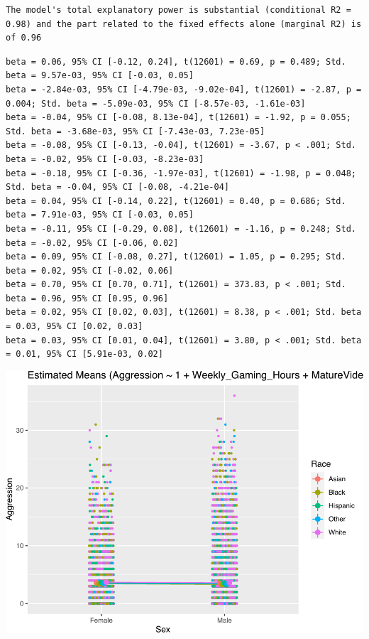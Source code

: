 \documentclass{article}
\begin{document}
\begin{verbatim}
The model's total explanatory power is substantial (conditional R2 = 0.98) and the part related to the fixed effects alone (marginal R2) is of 0.96
\end{verbatim}

\begin{verbatim}
beta = 0.06, 95% CI [-0.12, 0.24], t(12601) = 0.69, p = 0.489; Std. beta = 9.57e-03, 95% CI [-0.03, 0.05]
beta = -2.84e-03, 95% CI [-4.79e-03, -9.02e-04], t(12601) = -2.87, p = 0.004; Std. beta = -5.09e-03, 95% CI [-8.57e-03, -1.61e-03]
beta = -0.04, 95% CI [-0.08, 8.13e-04], t(12601) = -1.92, p = 0.055; Std. beta = -3.68e-03, 95% CI [-7.43e-03, 7.23e-05]
beta = -0.08, 95% CI [-0.13, -0.04], t(12601) = -3.67, p < .001; Std. beta = -0.02, 95% CI [-0.03, -8.23e-03]
beta = -0.18, 95% CI [-0.36, -1.97e-03], t(12601) = -1.98, p = 0.048; Std. beta = -0.04, 95% CI [-0.08, -4.21e-04]
beta = 0.04, 95% CI [-0.14, 0.22], t(12601) = 0.40, p = 0.686; Std. beta = 7.91e-03, 95% CI [-0.03, 0.05]
beta = -0.11, 95% CI [-0.29, 0.08], t(12601) = -1.16, p = 0.248; Std. beta = -0.02, 95% CI [-0.06, 0.02]
beta = 0.09, 95% CI [-0.08, 0.27], t(12601) = 1.05, p = 0.295; Std. beta = 0.02, 95% CI [-0.02, 0.06]
beta = 0.70, 95% CI [0.70, 0.71], t(12601) = 373.83, p < .001; Std. beta = 0.96, 95% CI [0.95, 0.96]
beta = 0.02, 95% CI [0.02, 0.03], t(12601) = 8.38, p < .001; Std. beta = 0.03, 95% CI [0.02, 0.03]
beta = 0.03, 95% CI [0.01, 0.04], t(12601) = 3.80, p < .001; Std. beta = 0.01, 95% CI [5.91e-03, 0.02]
\end{verbatim}

\begin{center}\includegraphics[width=0.75\linewidth]{WorkingDraft_files/figure-latex/meanplot-1} \end{center}
\end{document}
